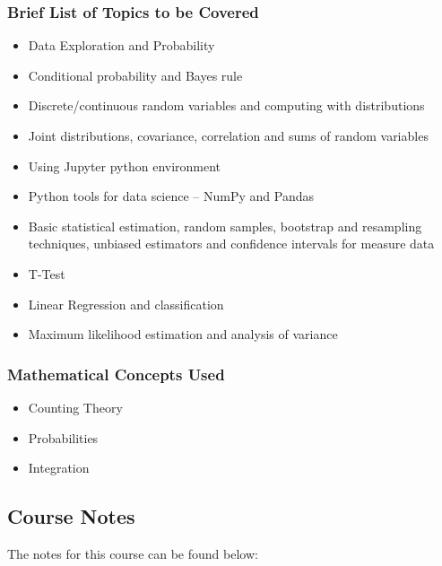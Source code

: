 {\begin{highlight}[\CSPBDataSci]
        \subsubsection*{Brief List of Topics to be Covered}
    
        \begin{itemize}
            \item Data Exploration and Probability
            \item Conditional probability and Bayes rule
            \item Discrete/continuous random variables and computing with distributions
            \item Joint distributions, covariance, correlation and sums of random variables
            \item Using Jupyter python environment
            \item Python tools for data science – NumPy and Pandas
            \item Basic statistical estimation, random samples, bootstrap and resampling techniques, unbiased estimators and confidence intervals for measure data
            \item T-Test
            \item Linear Regression and classification
            \item Maximum likelihood estimation and analysis of variance
        \end{itemize}
        
        \subsubsection*{Mathematical Concepts Used}
        
        \begin{itemize}
            \item Counting Theory
            \item Probabilities
            \item Integration
        \end{itemize}
    \end{highlight}
}

\subsection{Course Notes}

The notes for this course can be found below: 